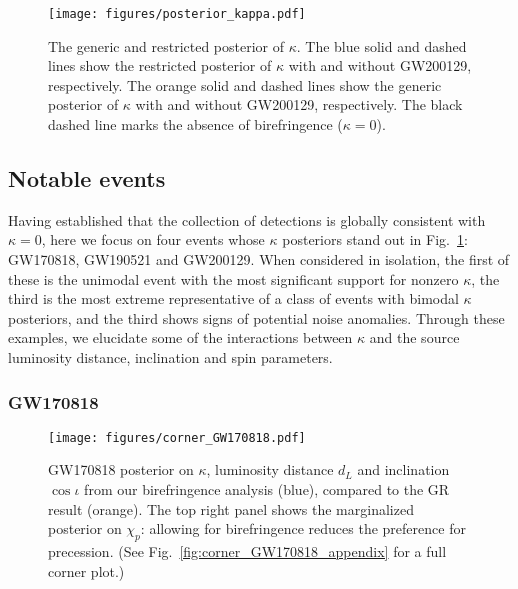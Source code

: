 \documentclass[aps,prd,twocolumn,superscriptaddress,preprintnumbers,floatfix,nofootinbib]{revtex4-2}
\begin{document}
\begin{figure}
    \texttt{[image: figures/posterior\_kappa.pdf]}
    \caption{
        The generic and restricted posterior of $\kappa$.
        The blue solid and dashed lines show the restricted posterior of $\kappa$ with and without GW200129, respectively.
        The orange solid and dashed lines show the generic posterior of $\kappa$ with and without GW200129, respectively.
        The black dashed line marks the absence of birefringence ($\kappa=0$).
    }
    \label{fig:posterior_kappa}
\end{figure}

\subsection{Notable events}
\label{sec:results:notable}

Having established that the collection of detections is globally consistent with $\kappa=0$, here we focus on four events whose $\kappa$ posteriors stand out in Fig.~\ref{fig:posterior_kappa}: GW170818, GW190521 and GW200129.
When considered in isolation, the first of these is the unimodal event with the most significant support for nonzero $\kappa$, the third is the most extreme representative of a class of events with bimodal $\kappa$ posteriors, and the third shows signs of potential noise anomalies.
Through these examples, we elucidate some of the interactions between $\kappa$ and the source luminosity distance, inclination and spin parameters.

\subsubsection{GW170818}
\label{sec:GW170818}

\begin{figure}
    \texttt{[image: figures/corner\_GW170818.pdf]}
    \caption{
        GW170818 posterior on $\kappa$, luminosity distance $d_L$ and inclination $\cos\iota$ from our birefringence analysis (blue), compared to the GR result (orange).
        The top right panel shows the marginalized posterior on $\chi_p$: allowing for birefringence reduces the preference for precession.
        (See Fig.~\ref{fig:corner_GW170818_appendix} for a full corner plot.)
    }
    \label{fig:corner_GW170818}
\end{figure}
\end{document}
